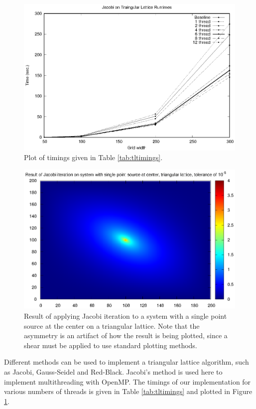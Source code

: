 \documentclass[paper=a4, fontsize=11pt]{scrartcl} %
\numberwithin{equation}{section} %
\numberwithin{figure}{section} %
\numberwithin{table}{section} %
\begin{document}
\begin{figure}
\centering
\includegraphics[width=120mm]{tl_timings.eps}
\caption{Plot of timings given in Table \ref{tab:tltimings}.}
\label{fig:tltimings}
\end{figure}

\begin{figure}
\centering
\includegraphics[width=120mm]{tl_heatmap.eps}
\caption{Result of applying Jacobi iteration to a system with a single point source at the center on a triangular lattice. Note that the asymmetry is an artifact of how the result is being plotted, since a shear must be applied to use standard plotting methods.}
\label{fig:tlheatmap}
\end{figure}

Different methods can be used to implement a triangular lattice algorithm, such as Jacobi, Gauss-Seidel and Red-Black. Jacobi's method is used here to implement multithreading with OpenMP. The timings of our implementation for various numbers of threads is given in Table \ref{tab:tltimings} and plotted in Figure \ref{fig:tltimings}.
\end{document}
